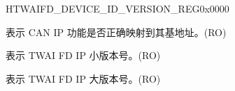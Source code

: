 \begin{register}{H}{TWAIFD\_DEVICE\_ID\_VERSION\_REG}{0x0000}\label{regdesc:TWAIFDDEVICEIDVERSIONREG}
%
%
%
\regnewline%
\begin{regdesc}\begin{reglist}
\label{fielddesc:TWAIFDDEVICEID}\item [TWAIFD\_DEVICE\_ID] 表示 CAN IP 功能是否正确映射到其基地址。(RO)
\label{fielddesc:TWAIFDVERMINOR}\item [TWAIFD\_VER\_MINOR] 表示 TWAI FD IP 小版本号。(RO)
\label{fielddesc:TWAIFDVERMAJOR}\item [TWAIFD\_VER\_MAJOR] 表示 TWAI FD IP 大版本号。(RO)
\end{reglist}\end{regdesc}
\end{register}


